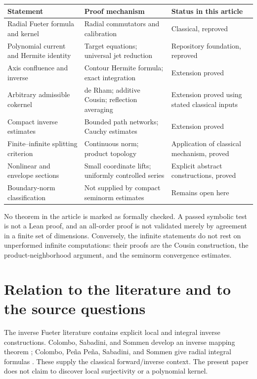\documentclass[11pt,a4paper]{article}
\numberwithin{equation}{section}
\theoremstyle{definition}
\theoremstyle{remark}
\begin{document}
\begin{center}
\small
\begin{tabular}{>{\raggedright\arraybackslash}p{}
 >{\raggedright\arraybackslash}p{}
 >{\raggedright\arraybackslash}p{}}
\toprule
Statement & Proof mechanism & Status in this article\\
\midrule
Radial Fueter formula and kernel & Radial commutators and calibration & Classical, reproved\\
Polynomial current and Hermite identity & Target equations; universal jet reduction & Repository foundation, reproved\\
Axis confluence and inverse & Contour Hermite formula; exact integration & Extension proved\\
Arbitrary admissible cokernel & de Rham; additive Cousin; reflection averaging & Extension proved using stated classical inputs\\
Compact inverse estimates & Bounded path networks; Cauchy estimates & Extension proved\\
Finite--infinite splitting criterion & Continuous norm; product topology & Application of classical mechanism, proved\\
Nonlinear and envelope sections & Small coordinate lifts; uniformly controlled series & Explicit abstract constructions, proved\\
Boundary-norm classification & Not supplied by compact seminorm estimates & Remains open here\\
\bottomrule
\end{tabular}
\end{center}

No theorem in the article is marked as formally checked. A passed symbolic
test is not a Lean proof, and an all-order proof is not validated merely by
agreement in a finite set of dimensions. Conversely, the infinite statements
do not rest on unperformed infinite computations: their proofs are the
Cousin construction, the product-neighborhood argument, and the seminorm
convergence estimates.

\section{Relation to the literature and to the source questions}
\label{sec:literature}

The inverse Fueter literature contains explicit local and integral inverse
constructions. Colombo, Sabadini, and Sommen develop an inverse mapping
theorem \cite{colombo2011}; Colombo, Pe\~na Pe\~na, Sabadini, and Sommen give
radial integral formulas \cite{colombo2014}. These supply the classical
forward/inverse context. The present paper does not claim to discover local
surjectivity or a polynomial kernel.
\end{document}
